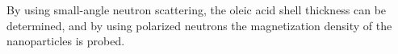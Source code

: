 \documentclass[\main/dresen_thesis.tex]{subfiles}
\begin{document}
  \label{sec:monolayers:nanoparticle:sans}

    By using small-angle neutron scattering, the oleic acid shell thickness can be determined, and by using polarized neutrons the magnetization density of the nanoparticles is probed.



\end{document}
